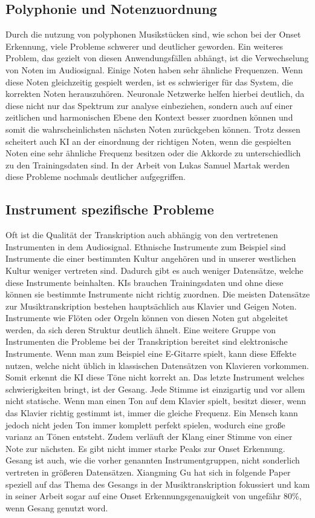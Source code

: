 \subsection{Polyphonie und Notenzuordnung}
Durch die nutzung von polyphonen Musikstücken sind, wie schon bei der Onset Erkennung,
viele Probleme schwerer und deutlicher geworden.
Ein weiteres Problem, das gezielt von diesen Anwendungsfällen abhängt, ist die Verwechselung von Noten im Audiosignal.
Einige Noten haben sehr ähnliche Frequenzen.
Wenn diese Noten gleichzeitig gespielt werden, ist es schwieriger für das System, die korrekten Noten herauszuhören.
Neuronale Netzwerke helfen hierbei deutlich, da diese nicht nur das Spektrum zur analyse einbeziehen,
sondern auch auf einer zeitlichen und harmonischen Ebene den Kontext besser zuordnen können
und somit die wahrscheinlichsten nächsten Noten zurückgeben können.
Trotz dessen scheitert auch KI an der einordnung der richtigen Noten, wenn die gespielten Noten
eine sehr ähnliche Frequenz besitzen oder die Akkorde zu unterschiedlich zu den Trainingsdaten sind.
In der Arbeit von Lukas Samuel Martak werden diese Probleme nochmals deutlicher aufgegriffen.
\cite{martak2022balancing}

\subsection{Instrument spezifische Probleme}
Oft ist die Qualität der Transkription auch abhängig von den vertretenen Instrumenten in dem Audiosignal.
Ethnische Instrumente zum Beispiel sind Instrumente die einer bestimmten Kultur angehören
und in unserer westlichen Kultur weniger vertreten sind.
Dadurch gibt es auch weniger Datensätze, welche diese Instrumente beinhalten.
KIs brauchen Trainingsdaten und ohne diese können sie bestimmte Instrumente nicht richtig zuordnen.
Die meisten Datensätze zur Musiktranskription bestehen hauptsächlich aus Klavier und Geigen Noten.
Instrumente wie Flöten oder Orgeln können von diesen Noten gut abgeleitet werden,
da sich deren Struktur deutlich ähnelt.
Eine weitere Gruppe von Instrumenten die Probleme bei der Transkription bereitet sind elektronische Instrumente.
Wenn man zum Beispiel eine E-Gitarre spielt, kann diese Effekte nutzen,
welche nicht üblich in klassischen Datensätzen von Klavieren vorkommen.
Somit erkennt die KI diese Töne nicht korrekt an.
Das letzte Instrument welches schwierigkeiten bringt, ist der Gesang.
Jede Stimme ist einzigartig und vor allem nicht statische.
Wenn man einen Ton auf dem Klavier spielt, besitzt dieser,
wenn das Klavier richtig gestimmt ist, immer die gleiche Frequenz.
Ein Mensch kann jedoch nicht jeden Ton immer komplett perfekt spielen, wodurch eine große varianz an Tönen entsteht.
Zudem verläuft der Klang einer Stimme von einer Note zur nächsten.
Es gibt nicht immer starke Peaks zur Onset Erkennung.
Gesang ist auch, wie die vorher genannten Instrumentgruppen, nicht sonderlich vertreten in größeren Datensätzen.
Xiangming Gu hat sich in folgende Paper speziell auf das Thema des Gesangs in der Musiktranskription fokussiert
\cite{gu2023deep,gu2024automatic}
und kam in seiner Arbeit sogar auf eine Onset Erkennungsgenauigkeit von ungefähr 80\%, wenn Gesang genutzt word.

